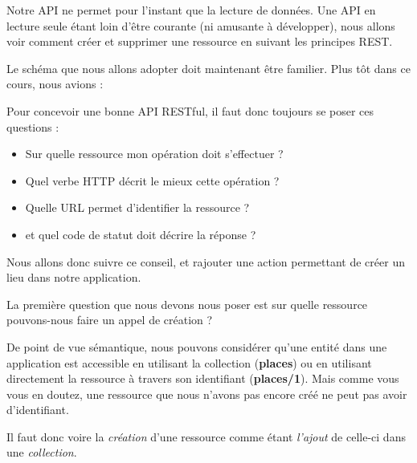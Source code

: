 \documentclass[big]{zmdocument}
\begin{document}


Notre API ne permet pour l'instant que la lecture de données. Une API en lecture seule étant loin d'être courante (ni amusante à développer), nous allons voir comment créer et supprimer une ressource en suivant les principes REST.





Le schéma que nous allons adopter doit maintenant être familier. Plus tôt dans ce cours, nous avions :



\begin{Quotation}
Pour concevoir une bonne API RESTful, il faut donc toujours se poser ces questions :

\begin{itemize}
\item Sur quelle ressource mon opération doit s'effectuer ?
\item Quel verbe HTTP décrit le mieux cette opération ?
\item Quelle URL permet d'identifier la ressource ?
\item et quel code de statut doit décrire la réponse ?
\end{itemize}
\end{Quotation}



Nous allons donc suivre ce conseil, et rajouter une action permettant de créer un lieu dans notre application.





\begin{Question}
La première question que nous devons nous poser est sur quelle ressource pouvons-nous faire un appel de création ?
\end{Question}


De point de vue sémantique, nous pouvons considérer qu'une entité dans une application est accessible en utilisant la collection (\textbf{places}) ou en utilisant directement la ressource à travers son identifiant (\textbf{places/1}). Mais comme vous vous en doutez, une ressource que nous n'avons pas encore créé ne peut pas avoir d'identifiant.



Il faut donc voire la \textit{création} d'une ressource comme étant \textit{l'ajout} de celle-ci dans une \textit{collection}.
\end{document}
